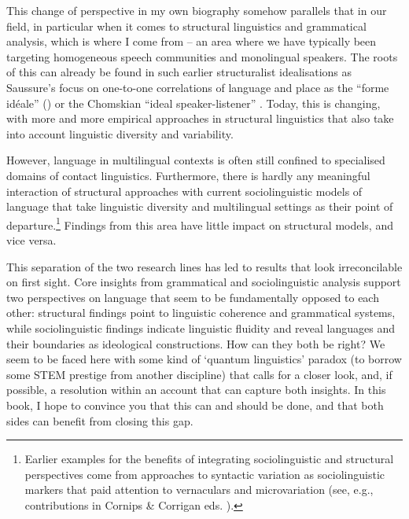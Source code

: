This change of perspective in my own biography somehow parallels that in our field, in particular when it comes to structural linguistics and grammatical analysis, which is where I come from – an area where we have typically been targeting homogeneous speech communities and monolingual speakers. The roots of this can already be found in such earlier structuralist idealisations as Saussure’s focus on one-to-one correlations of language and place as the “forme idéale” (\citealt[Part 4, Ch. 2, §1]{Saussure1916}) or the Chomskian “ideal speaker-listener” \citep{Chomsky1965}. Today, this is changing, with more and more empirical approaches in structural linguistics that also take into account linguistic diversity and variability.

However, language in multilingual contexts is often still confined to  specialised domains of contact linguistics. Furthermore, there is hardly any meaningful interaction of structural approaches with current sociolinguistic models of language that take linguistic diversity and multilingual settings as their point of departure.\footnote{Earlier examples for the benefits of integrating sociolinguistic and structural perspectives come from approaches to syntactic variation as sociolinguistic markers that paid attention to vernaculars and microvariation (see, e.g., contributions in Cornips \& Corrigan eds. \citeyear{CornipsCorrigan2005}).} Findings from this area have little impact on structural models, and vice versa.

This separation of the two research lines has led to results that look irreconcilable on first sight. Core insights from grammatical and sociolinguistic analysis support two perspectives on language that seem to be fundamentally opposed to each other: structural findings point to linguistic coherence and grammatical systems, while sociolinguistic findings indicate linguistic fluidity and reveal languages and their boundaries as ideological constructions. How can they both be right? We seem to be faced here with some kind of ‘quantum linguistics’ paradox (to borrow some STEM prestige from another discipline) that calls for a closer look, and, if possible, a resolution within an account that can capture both insights. In this book, I hope to convince you that this can and should be done, and that both sides can benefit from closing this gap.

